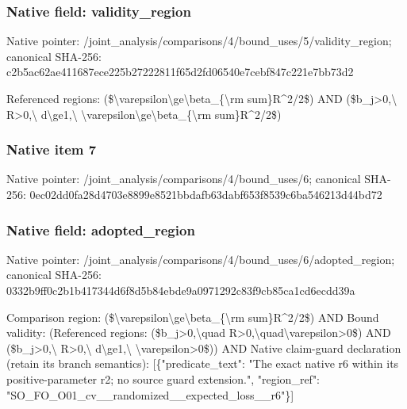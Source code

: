 \documentclass[10pt,a4paper]{article}
\begin{document}
\subsubsection{Native field: validity\_\allowbreak{}region}
Native pointer: /joint\_\allowbreak{}analysis/comparisons/4/bound\_\allowbreak{}uses/5/validity\_\allowbreak{}region; canonical SHA-256: c2b5ac62ae411687ece225b27222811f65d2fd06540e7cebf847c221e7bb73d2

\begingroup\raggedright\sloppy Referenced regions:\allowbreak{} (\$\textbackslash{}varepsilon\textbackslash{}ge\textbackslash{}beta\_\allowbreak{}\{\textbackslash{}rm sum\}R\textasciicircum{}2/\allowbreak{}2\$) AND (\$b\_\allowbreak{}j>0,\allowbreak{}\textbackslash{} R>0,\allowbreak{}\textbackslash{} d\textbackslash{}ge1,\allowbreak{}\textbackslash{} \textbackslash{}varepsilon\textbackslash{}ge\textbackslash{}beta\_\allowbreak{}\{\textbackslash{}rm sum\}R\textasciicircum{}2/\allowbreak{}2\$)\par\endgroup

\subsubsection{Native item 7}
Native pointer: /joint\_\allowbreak{}analysis/comparisons/4/bound\_\allowbreak{}uses/6; canonical SHA-256: 0ec02dd0fa28d4703e8899e8521bbdafb63dabf653f8539c6ba546213d44bd72

\subsubsection{Native field: adopted\_\allowbreak{}region}
Native pointer: /joint\_\allowbreak{}analysis/comparisons/4/bound\_\allowbreak{}uses/6/adopted\_\allowbreak{}region; canonical SHA-256: 0332b9ff0c2b1b417344d6f8d5b84ebde9a0971292c83f9cb85ca1cd6ecdd39a

\begingroup\raggedright\sloppy Comparison region:\allowbreak{} (\$\textbackslash{}varepsilon\textbackslash{}ge\textbackslash{}beta\_\allowbreak{}\{\textbackslash{}rm sum\}R\textasciicircum{}2/\allowbreak{}2\$) AND Bound validity:\allowbreak{} (Referenced regions:\allowbreak{} (\$b\_\allowbreak{}j>0,\allowbreak{}\textbackslash{}quad R>0,\allowbreak{}\textbackslash{}quad\textbackslash{}varepsilon>0\$) AND (\$b\_\allowbreak{}j>0,\allowbreak{}\textbackslash{} R>0,\allowbreak{}\textbackslash{} d\textbackslash{}ge1,\allowbreak{}\textbackslash{} \textbackslash{}varepsilon>0\$)) AND Native claim-guard declaration (retain its branch semantics):\allowbreak{} [\{"predicate\_\allowbreak{}text":\allowbreak{} "The exact native r6 within its positive-parameter r2;\allowbreak{} no source guard extension.",\allowbreak{} "region\_\allowbreak{}ref":\allowbreak{} "SO\_\allowbreak{}FO\_\allowbreak{}O01\_\allowbreak{}cv\_\allowbreak{}\_\allowbreak{}randomized\_\allowbreak{}\_\allowbreak{}expected\_\allowbreak{}loss\_\allowbreak{}\_\allowbreak{}r6"\}]\par\endgroup
\end{document}
